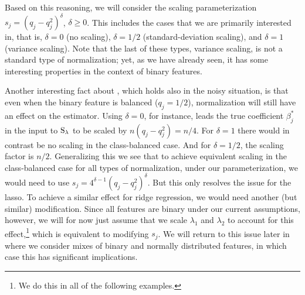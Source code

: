 Based on this reasoning, we will consider the scaling parameterization \(s_j =
(q_j-q_j^2)^\delta\), \(\delta \geq 0\). This includes the cases that we are primarily
interested in, that is, \(\delta = 0\) (no scaling), \(\delta = 1/2\) (standard-deviation
scaling), and \(\delta = 1\) (variance scaling). Note that the last of these types,
variance scaling, is not a standard type of normalization; yet, as we have already seen, it
has some interesting properties in the context of binary features.

Another interesting fact about , which holds also in the noisy
situation, is that even when the binary feature is balanced (\(q_j = 1/2\)), normalization
will still have an effect on the estimator. Using \(\delta = 0\), for instance, leads the
true coefficient \(\beta_j^*\) in the input to \(\operatorname{S}_\lambda\) to be scaled by \(n (q_j -
q_j^2) = n/4\). For \(\delta = 1\) there would in contrast be no scaling in the
class-balanced case. And for \(\delta = 1/2\), the scaling factor is \(n/2\). Generalizing
this we see that to achieve equivalent scaling in the class-balanced case for all types of
normalization, under our parameterization, we would need to use \(s_j = 4^{\delta - 1} (q_j
- q_j^2)^\delta\). But this only resolves the issue for the lasso. To achieve a similar
effect for ridge regression, we would need another (but similar) modification. Since all
features are binary under our current assumptions, however, we will for now just assume
that we scale \(\lambda_1\) and \(\lambda_2\) to account for this effect,\footnote{We do
  this in all of the following examples.} which is equivalent to modifying \(s_j\). We will
return to this issue later in  where we consider mixes of binary and
normally distributed features, in which case this has significant implications.

